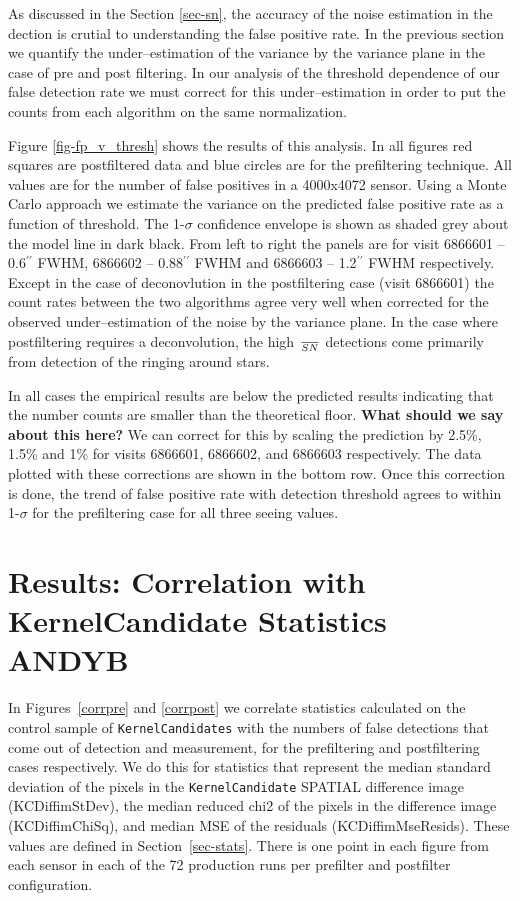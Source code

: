 \documentclass[prd, nofootinbib, floatfix, 11pt,tightenlines,times]{article}
\begin{document}
As discussed in the Section \ref{sec-sn}, the accuracy of the noise estimation in the dection is crutial to 
understanding the false positive rate.  In the previous section we quantify the under--estimation of the variance
by the variance plane in the case of pre and post filtering.  In our analysis of the threshold dependence of
our false detection rate we must correct for this under--estimation in order to put the counts from each algorithm
on the same normalization.

Figure \ref{fig-fp_v_thresh} shows the results of this analysis.  In all figures red squares are postfiltered data and
blue circles are for the prefiltering technique.  All values are for the number of false positives in a 4000x4072 sensor.
Using a Monte Carlo approach we 
estimate the variance on the predicted false positive rate as a function of threshold.  The 1-$\sigma$ confidence envelope is shown
as shaded grey about the model line in dark black.  From left to right the panels are for visit 6866601 -- 0.6$^{\prime\prime}$ FWHM,
6866602 -- 0.88$^{\prime\prime}$ FWHM and 6866603 -- 1.2$^{\prime\prime}$ FWHM respectively.  Except in the case of deconovlution
in the postfiltering case (visit 6866601) the count rates between the two algorithms agree very well when corrected for the
observed under--estimation of the noise by the variance plane.  In the case where postfiltering requires a deconvolution, the high $\over{S}{N}$
detections come primarily from detection of the ringing around stars.

In all cases the empirical results are below the predicted results indicating
that the number counts are smaller than the theoretical floor.  {\bf What should we say about this here?} We can correct for this by scaling
the prediction by 2.5\%, 1.5\% and 1\% for visits 6866601, 6866602, and 6866603 respectively.  The data plotted with these corrections are shown
in the bottom row.  Once this correction is done, the trend of false positive rate with detection threshold agrees to within 1-$\sigma$ for the 
prefiltering case for all three seeing values.

\section{Results: Correlation with KernelCandidate Statistics {\bf ANDYB}}

In Figures~\ref{corrpre} and \ref{corrpost} we correlate statistics
calculated on the control sample of {\tt KernelCandidates} with the
numbers of false detections that come out of detection and
measurement, for the prefiltering and postfiltering cases
respectively.  We do this for statistics that represent the median
standard deviation of the pixels in the {\tt KernelCandidate} SPATIAL
difference image (KCDiffimStDev), the median reduced chi2 of the
pixels in the difference image (KCDiffimChiSq), and median MSE of the
residuals (KCDiffimMseResids).  These values are defined in
Section~\ref{sec-stats}.  There is one point in each figure from each
sensor in each of the 72 production runs per prefilter and postfilter
configuration.
\end{document}
